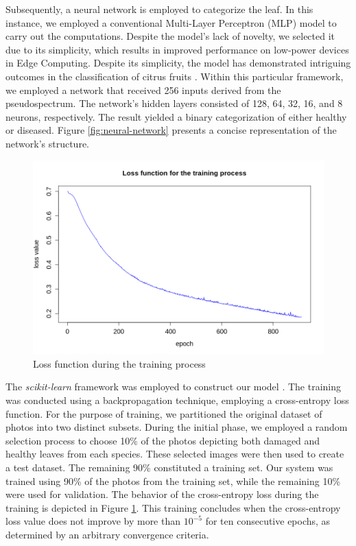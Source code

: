 Subsequently, a neural network is employed to categorize the leaf. In this instance, we employed a conventional Multi-Layer Perceptron (MLP) model to carry out the computations. Despite the model's lack of novelty, we selected it due to its simplicity, which results in improved performance on low-power devices in Edge Computing. Despite its simplicity, the model has demonstrated intriguing outcomes in the classification of citrus fruits \cite{iceis21orange}. Within this particular framework, we employed a network that received 256 inputs derived from the pseudospectrum. The network's hidden layers consisted of 128, 64, 32, 16, and 8 neurons, respectively. The result yielded a binary categorization of either healthy or diseased. Figure \ref{fig:neural-network} presents a concise representation of the network's structure.

\begin{figure}[h!]
    \centering
    \includegraphics[width = .7\linewidth]{Figures/loss_function.png}
    \caption{Loss function during the training process}
    \label{fig:loss_function}
\end{figure}

The \textit{scikit-learn} framework was employed to construct our model \cite{pedregosa2011scikit}. The training was conducted using a backpropagation technique, employing a cross-entropy loss function. For the purpose of training, we partitioned the original dataset of photos into two distinct subsets. During the initial phase, we employed a random selection process to choose 10\% of the photos depicting both damaged and healthy leaves from each species. These selected images were then used to create a test dataset. The remaining 90\% constituted a training set. Our system was trained using 90\% of the photos from the training set, while the remaining 10\% were used for validation. The behavior of the cross-entropy loss during the training is depicted in Figure \ref{fig:loss_function}. This training concludes when the cross-entropy loss value does not improve by more than $10^{-5}$ for ten consecutive epochs, as determined by an arbitrary convergence criteria.

